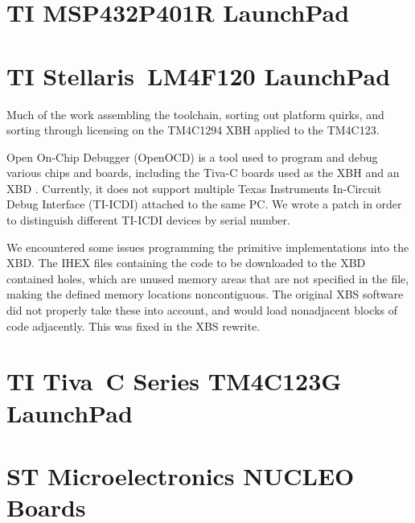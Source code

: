 \documentclass[twoside,11pt]{cergdoc}
\begin{document}
  \section{TI MSP432P401R LaunchPad\texttrademark}
  \section{TI Stellaris\textregistered~LM4F120 LaunchPad}
Much of the work assembling the toolchain, sorting out platform quirks, and
sorting through licensing on the TM4C1294 XBH applied to the TM4C123.

Open On-Chip Debugger (OpenOCD) is a tool used to program and debug various
chips and boards, including the Tiva-C boards used as the XBH and an XBD
\cite{openocd}. Currently, it does not support multiple Texas Instruments
In-Circuit Debug Interface (TI-ICDI) attached to the
same PC. We wrote a patch \cite{openocd_patch} in order to distinguish different
TI-ICDI devices by serial number. 

We encountered some issues programming the primitive implementations into the
XBD. The IHEX files containing the code to be downloaded to the XBD contained holes, which
are unused memory areas that are not specified in the file, making the defined
memory locations noncontiguous. The original XBS software did not properly take
these into account, and would load nonadjacent blocks of code adjacently. This
was fixed in the XBS rewrite. 

  \section{TI Tiva\texttrademark~C Series TM4C123G LaunchPad}
  \section{ST Microelectronics NUCLEO Boards}
\end{document}

